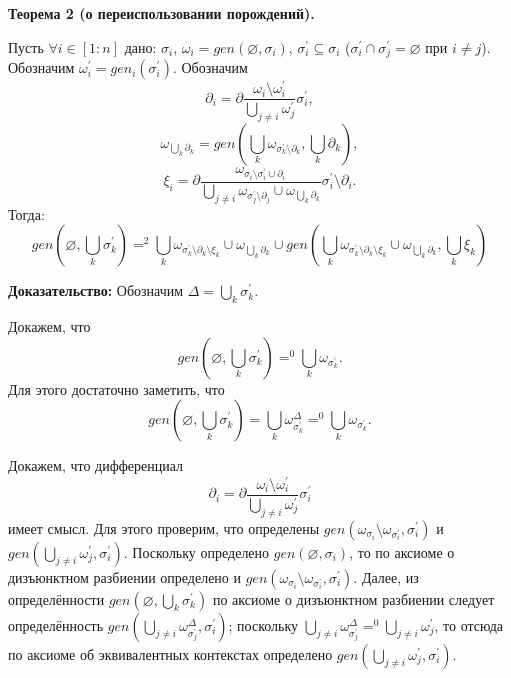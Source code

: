 \textbf{Теорема 2 (о переиспользовании порождений).}

\newcommand{\sigi}{{\sigma_i}}
\newcommand{\sigk}{{\sigma_k}}
\newcommand{\sigpi}{{\sigma^\prime_i}}
\newcommand{\sigpj}{{\sigma^\prime_j}}
\newcommand{\sigpk}{{\sigma^\prime_k}}
\newcommand{\parti}{{\partial_i}}
\newcommand{\partj}{{\partial_j}}
\newcommand{\partk}{{\partial_k}}
\newcommand{\xii}{{\xi_i}}
\newcommand{\xij}{{\xi_j}}
\newcommand{\xik}{{\xi_k}}
\newcommand{\sms}{{\setminus}}
\newcommand{\alloth}{\bigcup\limits_{j \neq i}\omega^\prime_j}
\newcommand{\allothk}{\bigcup\limits_{j \neq k}\omega^\prime_j}
\newcommand{\allothD}{\bigcup\limits_{j \neq i}\omega^\Delta_{\sigpj}}
\newcommand{\rprt}{{\text{п.ч.}}}

Пусть $\forall i \in [1:n]$ дано: $\sigma_i$, $\omega_i = gen(\varnothing, \sigma_i)$, $\sigma_i^\prime \subseteq \sigma_i$ ($\sigma_i^\prime \cap \sigma_j^\prime = \varnothing$ при $i \neq j$). Обозначим $\omega_i^\prime = gen_i(\sigma_i^\prime)$. Обозначим 
$$\partial_i = \partial\dfrac{\omega_i \setminus \omega_i^\prime}{\bigcup\limits_{j \neq i} \omega_j^\prime} \sigma_i^\prime,$$
$$\omega_{\bigcup\limits_k \partk} = gen(\bigcup\limits_k \omega_{\sigpk\sms\partk}, \bigcup\limits_k \partk),$$
$$\xi_i = \partial\dfrac{\omega_{\sigi\sms\sigpi \cup \parti}}{\bigcup\limits_{j \neq i} \omega_{\sigpj\sms\partj} \cup \omega_{\bigcup\limits_k \partial_k}} \sigpi\sms\parti.$$
Тогда:
$$gen(\varnothing, \bigcup\limits_k \sigpk) =^2 \bigcup\limits_k \omega_{\sigpk\sms\partk\sms\xik} \cup \omega_{\bigcup\limits_k \partial_k} \cup gen(\bigcup\limits_k \omega_{\sigpk\sms\partk\sms\xik} \cup \omega_{\bigcup\limits_k \partial_k}, \bigcup\limits_k \xik)$$

\textbf{Доказательство:}
Обозначим $\Delta = \bigcup\limits_k \sigpk$.

Докажем, что $$gen(\varnothing, \bigcup\limits_k \sigpk) =^0 \bigcup\limits_k \omega_{\sigpk}.$$ 
Для этого достаточно заметить, что $$gen(\varnothing, \bigcup\limits_k \sigpk) = \bigcup\limits_k \omega^\Delta_{\sigpk} =^0 \bigcup\limits_k \omega_{\sigpk}.$$

Докажем, что дифференциал $$\partial_i = \partial\dfrac{\omega_i \setminus \omega_i^\prime}{\alloth} \sigma_i^\prime$$ имеет смысл. Для этого проверим, что определены $gen(\omega_{\sigi} \setminus \omega_{\sigpi}, \sigpi)$ и $gen(\alloth, \sigpi)$. Поскольку определено $gen(\varnothing, \sigi)$, то по аксиоме о дизъюнктном разбиении определено и $gen(\omega_{\sigi} \setminus \omega_{\sigpi}, \sigpi)$. Далее, из определённости $gen(\varnothing, \bigcup\limits_k \sigma^\prime_k)$ по аксиоме о дизъюнктном разбиении следует определённость $gen(\bigcup\limits_{j \neq i}\omega^\Delta_\sigpj, \sigpi)$; поскольку $\bigcup\limits_{j \neq i}\omega^\Delta_\sigpj =^0 \alloth$, то отсюда по аксиоме об эквивалентных контекстах определено $gen(\alloth, \sigpi)$.

